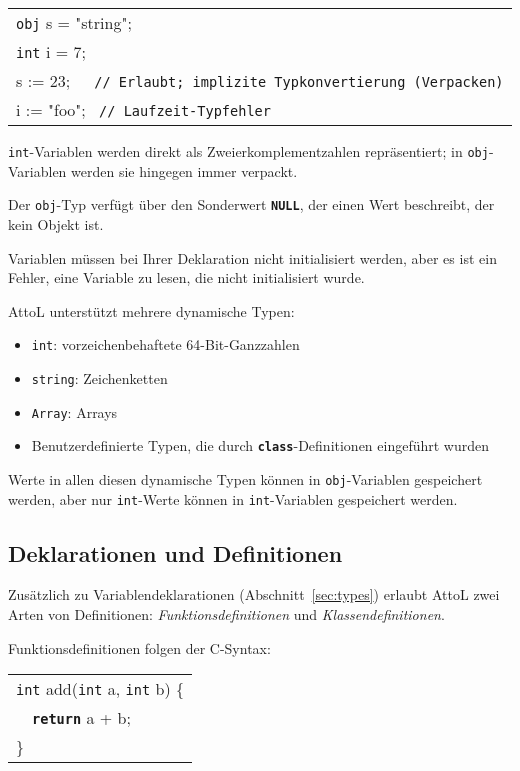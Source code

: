 \documentclass[11pt,a4paper]{article}
\newenvironment{slisting}{%
        \begin{tt}%
        \begin{tabular}{l}%
        }
        {%
        \end{tabular}%
        \end{tt}%
        }
\newcommand{\Cty}[1]{\textcolor{dblue}{\texttt{#1}}}
\newcommand{\Ccom}[1]{\textcolor{dgreen}{\texttt{#1}}}
\newcommand{\Ckw}[1]{\textbf{\texttt{#1}}}
\begin{document}
\begin{slisting}
\Cty{obj} s = "{}string";\\
\Cty{int} i = 7;\\
s := 23;\ \ \  \Ccom{// Erlaubt; implizite Typkonvertierung (Verpacken)}\\
i := "{}foo"; \ \Ccom{// Laufzeit-Typfehler}\\
\end{slisting}

\Cty{int}-Variablen werden direkt als Zweierkomplementzahlen repräsentiert;
in \Cty{obj}-Variablen werden sie hingegen immer verpackt.

Der \Cty{obj}-Typ verfügt über den Sonderwert \Ckw{NULL},
der einen Wert beschreibt, der kein Objekt ist.

Variablen müssen bei Ihrer Deklaration nicht initialisiert werden,
aber es ist ein Fehler, eine Variable zu lesen, die nicht
initialisiert wurde.

AttoL unterstützt mehrere dynamische Typen:
\begin{itemize}
\item \Cty{int}: vorzeichenbehaftete 64-Bit-Ganzzahlen
\item \Cty{string}: Zeichenketten
\item \Cty{Array}: Arrays
\item Benutzerdefinierte Typen, die durch \Ckw{class}-Definitionen eingeführt wurden
\end{itemize}

Werte in allen diesen dynamische Typen können in \Cty{obj}-Variablen
gespeichert werden, aber nur \Cty{int}-Werte können in
\Cty{int}-Variablen gespeichert werden.

\subsection{Deklarationen und Definitionen}\label{sec:decl}
Zusätzlich zu Variablendeklarationen (Abschnitt~\ref{sec:types}) erlaubt AttoL zwei Arten von Definitionen:
\emph{Funktionsdefinitionen} und \emph{Klassendefinitionen}.  

Funktionsdefinitionen folgen der C-Syntax:

\begin{slisting}
\Cty{int} add(\Cty{int} a, \Cty{int} b) \{\\
\ \ \Ckw{return} a + b;\\
\}\\
\end{slisting}
\end{document}
